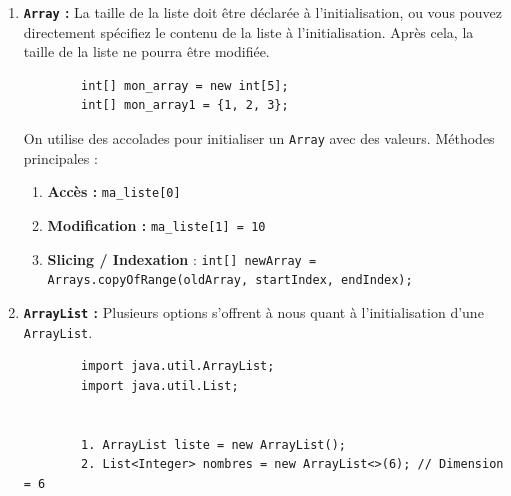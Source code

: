 \begin{enumerate}
    \item \textbf{\lstinline{Array} :} La taille de la liste doit être déclarée à l'initialisation, ou vous pouvez directement spécifiez le contenu de la liste à l'initialisation. Après cela, la taille de la liste ne pourra être modifiée.
    \begin{verbatim}
        int[] mon_array = new int[5];
        int[] mon_array1 = {1, 2, 3};
    \end{verbatim}
    On utilise des accolades pour initialiser un \lstinline{Array} avec des valeurs.
    Méthodes principales :
    \begin{enumerate}
        \item \textbf{Accès :} \lstinline{ma_liste[0]}
        \item \textbf{Modification :} \lstinline{ma_liste[1] = 10}
        \item \textbf{Slicing / Indexation} : \lstinline{int[] newArray = Arrays.copyOfRange(oldArray, startIndex, endIndex);} 
    \end{enumerate}
    
    
    \item \textbf{\lstinline{ArrayList} :} Plusieurs options s'offrent à nous quant à l'initialisation d'une \lstinline{ArrayList}.
    \begin{verbatim}
        import java.util.ArrayList;
        import java.util.List;
        
        
        1. ArrayList liste = new ArrayList();
        2. List<Integer> nombres = new ArrayList<>(6); // Dimension = 6
         

\end{verbatim}
\end{enumerate}
